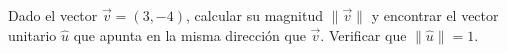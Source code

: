 Dado el vector $\vec{v} = (3, -4)$, calcular su magnitud $\|\vec{v}\|$ y encontrar el vector unitario $\hat{u}$ que apunta en la misma dirección que $\vec{v}$. Verificar que $\|\hat{u}\| = 1$.